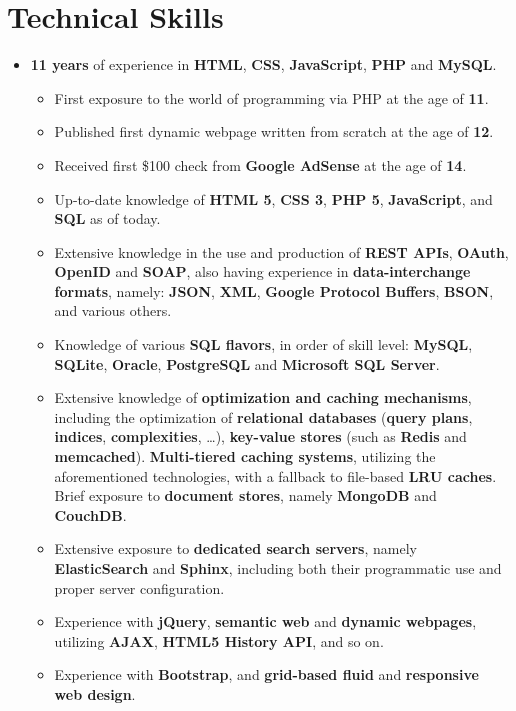 \documentclass[11pt,a4paper]{article}
\begin{document}
\section*{Technical Skills}
	\begin{itemize}
	\item	\textbf{11 years} of experience in \textbf{HTML}, \textbf{CSS}, \textbf{JavaScript}, \textbf{PHP} and \textbf{MySQL}.
		\begin{itemize}
		\item	First exposure to the world of programming via PHP at the age of \textbf{11}.
		\item	Published first dynamic webpage written from scratch at the age of \textbf{12}.
		\item	Received first \$100 check from \textbf{Google AdSense} at the age of \textbf{14}.
		\item	Up-to-date knowledge of \textbf{HTML 5}, \textbf{CSS 3}, \textbf{PHP 5}, \textbf{JavaScript}, and \textbf{SQL} as of today.
		\item	Extensive knowledge in the use and production of \textbf{REST APIs}, \textbf{OAuth}, \textbf{OpenID} and \textbf{SOAP}, also having experience in \textbf{data-interchange formats}, namely: \textbf{JSON}, \textbf{XML}, \textbf{Google Protocol Buffers}, \textbf{BSON}, and various others.
		\item	Knowledge of various \textbf{SQL flavors}, in order of skill level: \textbf{MySQL}, \textbf{SQLite}, \textbf{Oracle}, \textbf{PostgreSQL} and \textbf{Microsoft SQL Server}.
		\item	Extensive knowledge of \textbf{optimization and caching mechanisms}, including the optimization of \textbf{relational databases} (\textbf{query plans}, \textbf{indices}, \textbf{complexities}, \ldots), \textbf{key-value stores} (such as \textbf{Redis} and \textbf{memcached}). \textbf{Multi-tiered caching systems}, utilizing the aforementioned technologies, with a fallback to file-based \textbf{LRU caches}. Brief exposure to \textbf{document stores}, namely \textbf{MongoDB} and \textbf{CouchDB}.
		\item	Extensive exposure to \textbf{dedicated search servers}, namely \textbf{ElasticSearch} and \textbf{Sphinx}, including both their programmatic use and proper server configuration. 
		\item	Experience with \textbf{jQuery}, \textbf{semantic web} and \textbf{dynamic webpages}, utilizing \textbf{AJAX}, \textbf{HTML5 History API}, and so on.
		\item	Experience with \textbf{Bootstrap}, and \textbf{grid-based fluid} and \textbf{responsive web design}.

\end{itemize}
\end{itemize}
\end{document}
